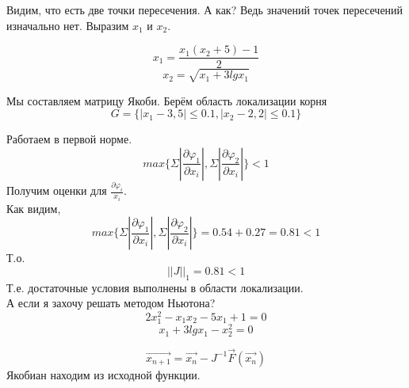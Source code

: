 \documentclass[a4paper,12pt]{article}
\newcommand\attention[1]{\colorbox{cyan!30}{#1}}
\begin{document}
    Видим, что есть две точки пересечения. А как? Ведь значений точек пересечений изначально нет. Выразим $x_1$ и $x_2$.

    \[x_1 = \frac{x_1 (x_2 + 5) - 1}{2}\]
    \[x_2 = \sqrt{x_1 + 3lgx_1}\]

    Мы составляем матрицу Якоби. Берём область локализации корня
    $$G = \{|x_1 - 3,5| \leq 0.1, |x_2 - 2,2| \leq 0.1\}$$

    Работаем в первой норме.
    $$max \{\Sigma|\frac{\partial \varphi_1}{\partial x_i}|, \Sigma|\frac{\partial \varphi_2}{\partial x_i}|\} < 1$$
    Получим оценки для $\frac{\partial \varphi_i}{x_i}$.\\
    Как видим,     
    $$max \{\Sigma|\frac{\partial \varphi_1}{\partial x_i}|, \Sigma|\frac{\partial \varphi_2}{\partial x_i}|\} = 0.54 + 0.27 = 0.81 < 1$$
    Т.о.
    \[||J||_1 = 0.81 < 1\]
    Т.е. достаточные условия выполнены в области локализации.\\
    
    А если я захочу решать \attention{методом Ньютона}?
    \[2x_1^2 - x_1 x_2 - 5x_1 + 1 = 0\]
    \[x_1 + 3lgx_1 - x_2^2 = 0\]
    
    \[\overrightarrow{x_{n+1}} = \overrightarrow{x_n} - J^{-1} \overrightarrow{F}(\overrightarrow{x_n})\]
    Якобиан находим из исходной функции.
    
    
\section{}
\end{document}
